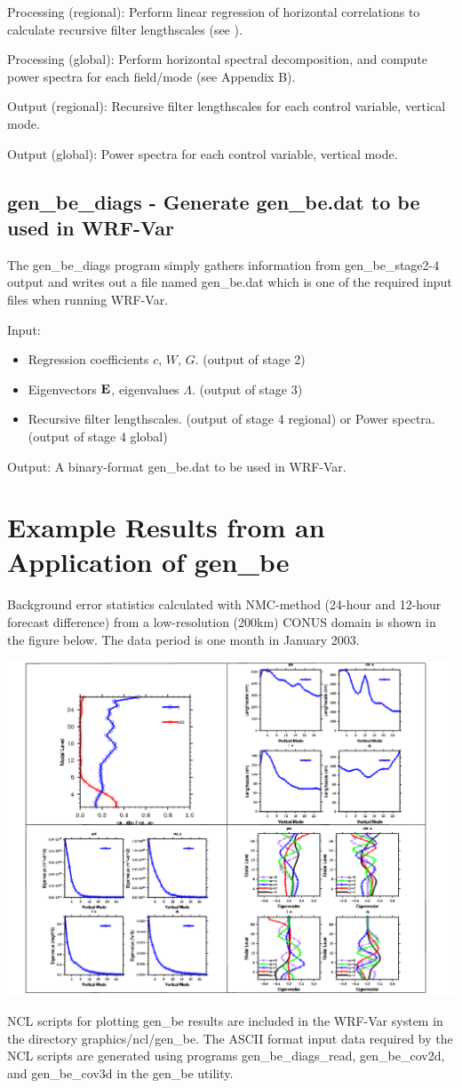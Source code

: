 Processing (regional): Perform linear regression of horizontal correlations to calculate recursive filter lengthscales (see \citet{barker04}).

Processing (global): Perform horizontal spectral decomposition, and compute power spectra for each field/mode (see Appendix B).

Output (regional): Recursive filter lengthscales for each control variable, vertical mode.

Output (global): Power spectra for each control variable, vertical mode.


\subsection{gen\_be\_diags - Generate gen\_be.dat to be used in WRF-Var}

The gen\_be\_diags program simply gathers information from gen\_be\_stage2-4 output and writes out a file named gen\_be.dat which is one of the required input files when running WRF-Var.

Input:
\begin{itemize}\setlength{\parskip}{-4pt}
\item Regression coefficients $c$, $W$, $G$. (output of stage 2)
\item Eigenvectors $\bf E$, eigenvalues $\Lambda$. (output of stage 3)
\item Recursive filter lengthscales. (output of stage 4 regional) or Power spectra. (output of stage 4 global)
\end{itemize}

Output: A binary-format gen\_be.dat to be used in WRF-Var.


\section{Example Results from an Application of gen\_be}

Background error statistics calculated with NMC-method (24-hour and 12-hour forecast difference) from a low-resolution (200km) CONUS domain is shown in the figure below. The data period is one month in January 2003.

\includegraphics[width=7.0in]{figures/gen_be_results.pdf}

NCL scripts for plotting gen\_be results are included in the WRF-Var system in the directory graphics/ncl/gen\_be. The ASCII format input data required by the NCL scripts are generated using programs gen\_be\_diags\_read, gen\_be\_cov2d, and gen\_be\_cov3d in the gen\_be utility.


